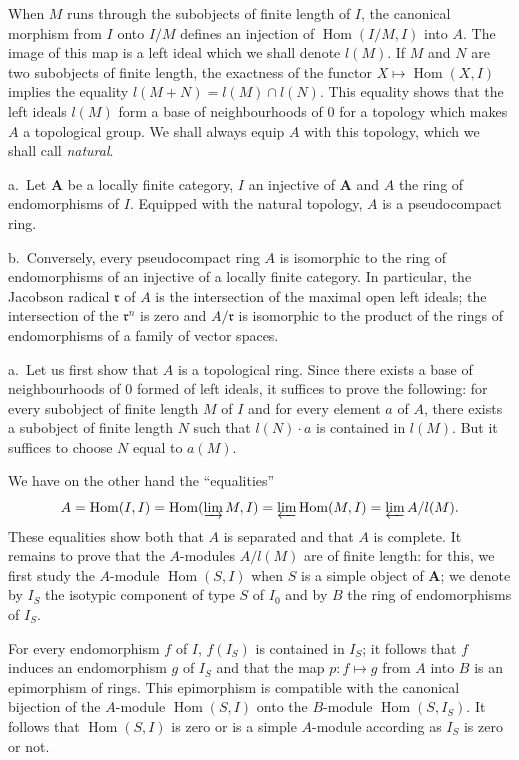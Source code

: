 When $M$ runs through the subobjects of finite length of $I$, the
canonical morphism from $I$ onto $I/M$ defines an injection of
$\operatorname{Hom}(I/M,I)$ into $A$. The image of this map is a left
ideal which we shall denote $l(M)$. If $M$ and $N$ are two subobjects
of finite length, the exactness of the functor
$X\mapsto\operatorname{Hom}(X,I)$ implies the equality
$l(M+N)=l(M)\cap l(N)$. This equality shows that the left ideals $l(M)$
form a base of neighbourhoods of $0$ for a topology which makes $A$ a
topological group. We shall always equip $A$ with this topology, which
we shall call \emph{natural}.

\begin{proposition}
a.\ Let $\mathbf{A}$ be a locally finite category, $I$ an injective of
$\mathbf{A}$ and $A$ the ring of endomorphisms of $I$. Equipped with the
natural topology, $A$ is a pseudocompact ring.

b.\ Conversely, every pseudocompact ring $A$ is isomorphic to the ring
of endomorphisms of an injective of a locally finite category. In
particular, the Jacobson radical $\mathfrak{r}$ of $A$ is the
intersection of the maximal open left ideals; the intersection of the
$\mathfrak{r}^n$ is zero and $A/\mathfrak{r}$ is isomorphic to the
product of the rings of endomorphisms of a family of vector spaces.
\end{proposition}

a.\ Let us first show that $A$ is a topological ring. Since there
exists a base of neighbourhoods of $0$ formed of left ideals, it
suffices to prove the following: for every subobject of finite length
$M$ of $I$ and for every element $a$ of $A$, there exists a subobject
of finite length $N$ such that $l(N)\cdot a$ is contained in $l(M)$.
But it suffices to choose $N$ equal to $a(M)$.

We have on the other hand the ``equalities''
\[
A=\operatorname{Hom}(I,I)=\operatorname{Hom}(\varinjlim M,I)=\varprojlim\operatorname{Hom}(M,I)=\varprojlim A/l(M).
\]
These equalities show both that $A$ is separated and that $A$ is
complete. It remains to prove that the $A$-modules $A/l(M)$ are of
finite length: for this, we first study the $A$-module
$\operatorname{Hom}(S,I)$ when $S$ is a simple object of $\mathbf{A}$;
we denote by $I_S$ the isotypic component of type $S$ of $I_0$ and by
$B$ the ring of endomorphisms of $I_S$.

For every endomorphism $f$ of $I$, $f(I_S)$ is contained in $I_S$; it
follows that $f$ induces an endomorphism $g$ of $I_S$ and that the map
$p\colon f\mapsto g$ from $A$ into $B$ is an epimorphism of rings. This
epimorphism is compatible with the canonical bijection of the
$A$-module $\operatorname{Hom}(S,I)$ onto the $B$-module
$\operatorname{Hom}(S,I_S)$. It follows that $\operatorname{Hom}(S,I)$
is zero or is a simple $A$-module according as $I_S$ is zero or not.

